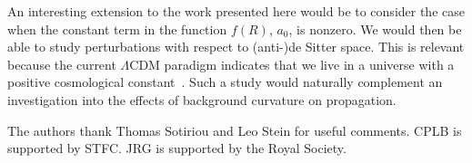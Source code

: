 \documentclass[aps,prd,amsfonts,amssymb,amsmath,nofootinbib,reprint,showpacs]{revtex4-1}
\begin{document}
An interesting extension to the work presented here would be to consider the case when the constant term in the function $f(R)$, $a_0$, is nonzero. We would then be able to study perturbations with respect to (anti-)de Sitter space. This is relevant because the current $\Lambda$CDM paradigm indicates that we live in a universe with a positive cosmological constant~\cite{Jarosik2011, Komatsu2011}. Such a study would naturally complement an investigation into the effects of background curvature on propagation.

\begin{acknowledgments}
The authors thank Thomas Sotiriou and Leo Stein for useful comments. CPLB is supported by STFC. JRG is supported by the Royal Society.
\end{acknowledgments}


\end{document}
